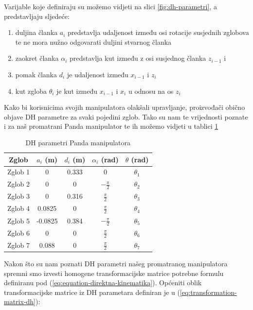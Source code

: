 \documentclass[times, utf8, diplomskirad]{fer}
\begin{document}
\noindent Varijable koje definiraju su možemo vidjeti na slici \ref{fig:dh-parametri}, a predstavljaju sljedeće:
\begin{enumerate}
    \item duljina članka \textit{$a_i$} predstavlja udaljenost između osi rotacije susjednih zglobova te ne mora nužno odgovarati duljini stvarnog članka
    \item zaokret članka \textit{$\alpha_i$} predstavlja kut između z osi susjednog članka \textit{$z_{i-1}$} i
    \item pomak članka \textit{$d_i$} je udaljenost između \textit{$x_{i-1}$} i \textit{$z_{i}$}
    \item kut zgloba \textit{$\theta_i$} je kut između \textit{$x_{i-1}$} i \textit{$x_{i}$} u odnosu na os \textit{$z_{i}$}
\end{enumerate}
Kako bi korisnicima svojih manipulatora olakšali upravljanje, proizvođači obično objave DH parametre za svaki pojedini zglob.
Tako su nam te vrijednosti poznate i za naš promatrani Panda manipulator te ih možemo vidjeti u tablici \ref{tab:dh_parameters}
\renewcommand{\arraystretch}{2}
\begin{table}[H]
\centering
\begin{tabular}{|c|c|c|c|c|}
\hline
\textbf{Zglob} & \textbf{$a_i$ (m)} & \textbf{$d_i$ (m)} & \textbf{$\alpha_i$ (rad)} & \textbf{\(\theta\) (rad)} \\
\hline
Zglob 1 & 0 & 0.333 & 0 & \(\theta_1\) \\
\hline
Zglob 2 & 0 & 0 & \(-\frac{\pi}{2}\) & \(\theta_2\) \\
\hline
Zglob 3 & 0 & 0.316 & \(\frac{\pi}{2}\) & \(\theta_3\) \\
\hline
Zglob 4 & 0.0825 & 0 & \(\frac{\pi}{2}\) & \(\theta_4\) \\
\hline
Zglob 5 & -0.0825 & 0.384 & \(-\frac{\pi}{2}\) & \(\theta_5\) \\
\hline
Zglob 6 & 0 & 0 & \(\frac{\pi}{2}\) & \(\theta_6\) \\
\hline
Zglob 7 & 0.088 & 0 & \(\frac{\pi}{2}\) & \(\theta_7\) \\
\hline
\end{tabular}
\caption{DH parametri Panda manipulatora}
\label{tab:dh_parameters}
\end{table}
Nakon što su nam poznati DH parametri našeg promatranog manipulatora spremni smo izvesti homogene transformacijske matrice potrebne formulu definiranu pod (\ref{eq:equation-direktna-kinematika}).
Općeniti oblik transformacijske matrice iz DH parametara definiran je u (\ref{eq:transformation-matrix-dh}):
\end{document}
